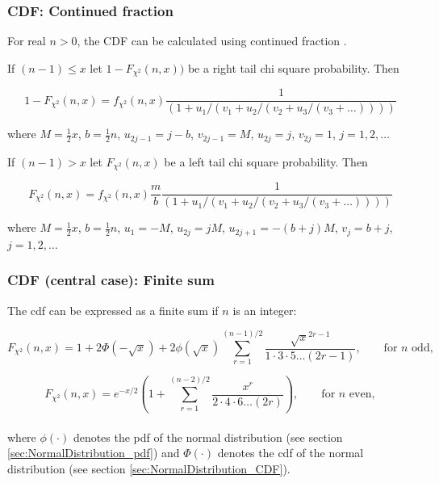 \subsubsection{CDF: Continued fraction}
For real $n > 0$, the CDF can be calculated using  continued fraction \citep{peizerNormalPart1_1968}.

If $(n-1) \le x$ let $1- F_{\chi^2}\left(n, x\right))$ be a right tail chi square probability. Then

\begin{equation}
	1- F_{\chi^2}\left(n, x\right) = f_{\chi^2}(n, x)  \frac{1}{\left(1+u_1/(v_1 + u_2 / (v_2 + u_3 / (v_3 + \ldots ))) \right)}
\end{equation}

where $M = \tfrac{1}{2}x$, $b = \tfrac{1}{2}n$, $u_{2j-1} = j-b$, $v_{2j-1} = M$, $u_{2j}=j$, $v_{2j}=1$, $j=1,2,\ldots$ 


If $(n-1) > x$ let $ F_{\chi^2}\left(n, x\right)$ be a left tail chi square probability. Then

\begin{equation}
	F_{\chi^2}\left(n, x\right) = f_{\chi^2}(n, x)  \frac{m}{b}  \frac{1}{\left(1+u_1/(v_1 + u_2 / (v_2 + u_3 / (v_3 + \ldots ))) \right)}
\end{equation}

where $M = \tfrac{1}{2}x$, $b = \tfrac{1}{2}n$, $u_1 = -M$,  $u_{2j} = jM$, $u_{2j+1}=-(b+j)M$, $v_{j}=b+j$, $j=1,2,\ldots$ 



\subsubsection{CDF (central case): Finite sum}
The cdf can be expressed as a finite sum if $n$ is an integer:

\begin{equation}
F_{\chi^2}\left(n, x\right) = 1+2\Phi(-\sqrt{x})+2\phi \left(\sqrt{x}\right) \sum_{r=1}^{(n-1)/2} \frac{\sqrt{x}^{2r-1}}{1 \cdot 3 \cdot 5 \ldots (2r-1)}, \qquad \text{for } n \text{ odd},
\end{equation}

\begin{equation}
F_{\chi^2}\left(n, x\right) = e^{-x/2} \left(1+ \sum_{r=1}^{(n-2)/2} \frac{x^{r}}{2 \cdot 4 \cdot 6 \ldots (2r)}\right), \qquad \text{for } n \text{ even},
\end{equation} \\
where $\phi(\cdot)$ denotes the pdf of the normal distribution (see section \ref{sec:NormalDistribution_pdf}) and  $\Phi(\cdot)$ denotes the cdf of the normal distribution (see section \ref{sec:NormalDistribution_CDF}).





